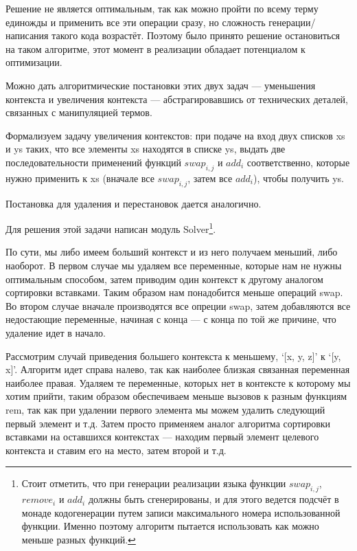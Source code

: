 Решение не является оптимальным, так как можно пройти по всему терму единожды и применить все эти операции сразу, но сложность генерации/написания такого кода возрастёт. Поэтому было принято решение остановиться на таком алгоритме, этот момент в реализации обладает потенциалом к оптимизации.

\hfill

Можно дать алгоритмические постановки этих двух задач --- уменьшения контекста и увеличения контекста --- абстрагировавшись от технических деталей, связанных с манипуляцией термов.

Формализуем задачу увеличения контекстов: при подаче на вход двух списков xs и ys таких, что все элементы xs находятся в списке ys, выдать две последовательности применений функций $swap_{i,j}$ и $add_i$ соответственно, которые нужно применить к xs (вначале все $swap_{i,j}$, затем все $add_i$), чтобы получить ys.

Постановка для удаления и перестановок дается аналогично.

Для решения этой задачи написан модуль Solver\footnote{Стоит отметить, что при генерации реализации языка функции $swap_{i,j}$, $remove_i$ и $add_i$ должны быть сгенерированы, и для этого ведется подсчёт в монаде кодогенерации путем записи максимального номера использованной функции. Именно поэтому алгоритм пытается использовать как можно меньше разных функций.}.

По сути, мы либо имеем больший контекст и из него получаем меньший, либо наоборот. В первом случае мы удаляем все переменные, которые нам не нужны оптимальным способом, затем приводим один контекст к другому аналогом сортировки вставками. Таким образом нам понадобится меньше операций swap. Во втором случае вначале производятся все опреции swap, затем добавляются все недостающие переменные, начиная с конца --- с конца по той же причине, что удаление идет в начало.

Рассмотрим случай приведения большего контекста к меньшему, `[x, y, z]' к `[y, x]'. Алгоритм идет справа налево, так как наиболее близкая связанная переменная наиболее правая. Удаляем те переменные, которых нет в контексте к которому мы хотим прийти, таким образом обеспечиваем меньше вызовов к разным функциям rem, так как при удалении первого элемента мы можем удалить следующий первый элемент и т.д. Затем просто применяем аналог алгоритма сортировки вставками на оставшихся контекстах --- находим первый элемент целевого контекста и ставим его на место, затем второй и т.д.

\hfill

